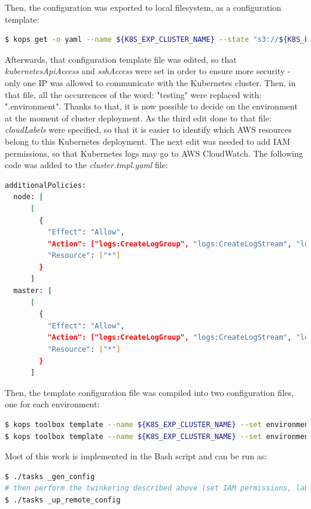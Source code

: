 Then, the configuration was exported to local filesystem, as a configuration template:
\begin{lstlisting}[basicstyle=\tiny,caption={Command used export kops configuration from S3 to a local file},captionpos=b,language=Bash,xleftmargin=1cm]
$ kops get -o yaml --name ${K8S_EXP_CLUSTER_NAME} --state "s3://${K8S_EXP_KOPS_S3_BUCKET}" > cluster.tmpl.yaml
\end{lstlisting}

Afterwards, that configuration template file was edited, so that \textit{kubernetesApiAccess} and \textit{sshAccess} were set in order to ensure more security - only one IP was allowed to communicate with the Kubernetes cluster. Then, in that file, all the occurrences of the word: "testing" were replaced with: "{{.environment}}". Thanks to that, it is now possible to decide on the environment at the moment of cluster deployment. As the third edit done to that file: \textit{cloudLabels} were specified, so that it is easier to identify which AWS resources belong to this Kubernetes deployment\cite{online-kops-labels}. The next edit was needed to add IAM permissions, so that Kubernetes logs may go to AWS CloudWatch. The following code was added to the \textit{cluster.tmpl.yaml} file:
\begin{lstlisting}[basicstyle=\tiny,caption={TODO},captionpos=b,language=Bash,xleftmargin=1cm]
additionalPolicies:
  node: |
      [
        {
          "Effect": "Allow",
          "Action": ["logs:CreateLogGroup", "logs:CreateLogStream", "logs:PutLogEvents", "logs:DescribeLogGroups", "logs:DescribeLogStreams"],
          "Resource": ["*"]
        }
      ]
  master: |
      [
        {
          "Effect": "Allow",
          "Action": ["logs:CreateLogGroup", "logs:CreateLogStream", "logs:PutLogEvents", "logs:DescribeLogGroups", "logs:DescribeLogStreams"],
          "Resource": ["*"]
        }
      ]
\end{lstlisting}

Then, the template configuration file was compiled into two configuration files, one for each environment:
\begin{lstlisting}[basicstyle=\tiny,caption={TODO},captionpos=b,language=Bash,xleftmargin=1cm]
$ kops toolbox template --name ${K8S_EXP_CLUSTER_NAME} --set environment=testing --template cluster.tmpl.yaml --format-yaml > cluster-testing.yaml
$ kops toolbox template --name ${K8S_EXP_CLUSTER_NAME} --set environment=production --template cluster.tmpl.yaml --format-yaml > cluster-production.yaml
\end{lstlisting}
Most of this work is implemented in the Bash script and can be run as:
\begin{lstlisting}[basicstyle=\tiny,caption={TODO},captionpos=b,language=Bash,xleftmargin=1cm]
$ ./tasks _gen_config
# then perform the twinkering described above (set IAM permissions, labels and security settings)
$ ./tasks _up_remote_config
\end{lstlisting}

